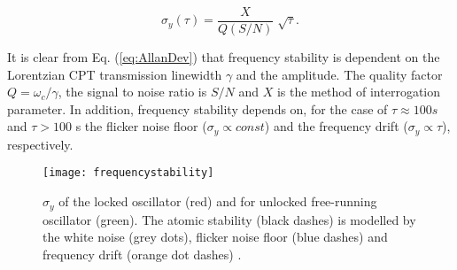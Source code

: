 \begin{equation}
\label{eq:AllanDev}
\sigma_{y}(\tau)=\frac{X}{Q(S/N)}\sqrt[]{\tau}.
\end{equation}

It is clear from Eq. (\ref{eq:AllanDev}) that frequency stability is dependent on the Lorentzian CPT transmission linewidth $\gamma$ and the amplitude.   
The quality factor $Q=\omega_{c} /\gamma$, the signal to noise ratio is $S/N$ and $X$ is the method of interrogation parameter. In addition, frequency stability depends on, for the case of $\tau\approx100 s$ and $\tau>100$ s the flicker noise floor ($\sigma_{y}\propto const$) and the frequency drift ($\sigma_{y}\propto\tau$), respectively.  

\begin{figure}[t]
\centering
\texttt{[image: frequencystability]}
\caption{\label{fig:frequencystability} $\sigma_{y}$ of the locked oscillator (red) and for unlocked free-running oscillator (green). The atomic stability (black dashes) is modelled by the white noise (grey dots), flicker noise floor (blue dashes) and frequency drift (orange dot dashes) \citep{Knappe2007MEMSClocks}.}
\end{figure}



